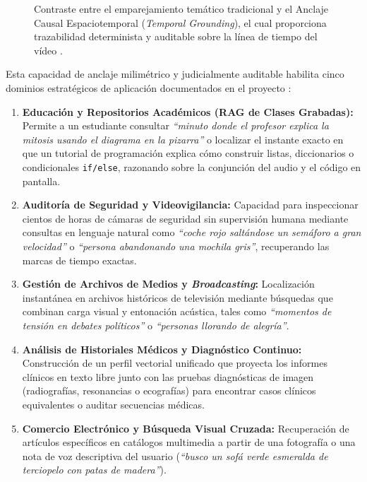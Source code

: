 \begin{figure}[htbp]
\caption{Contraste entre el emparejamiento temático tradicional y el Anclaje Causal Espaciotemporal (\textit{Temporal Grounding}), el cual proporciona trazabilidad determinista y auditable sobre la línea de tiempo del vídeo \cite{mixpeek_chunking, gemini_emb2_docs}.} %
\label{fig:emparejamiento_vs_grounding_temporal}
\end{figure}

Esta capacidad de anclaje milimétrico y judicialmente auditable habilita cinco dominios estratégicos de aplicación documentados en el proyecto \cite{gemini_emb2_docs}: %
\begin{enumerate}
    \item \textbf{Educación y Repositorios Académicos (RAG de Clases Grabadas):} Permite a un estudiante consultar \textit{``minuto donde el profesor explica la mitosis usando el diagrama en la pizarra''} o localizar el instante exacto en que un tutorial de programación explica cómo construir listas, diccionarios o condicionales \texttt{if/else}, razonando sobre la conjunción del audio y el código en pantalla. %
    \item \textbf{Auditoría de Seguridad y Videovigilancia:} Capacidad para inspeccionar cientos de horas de cámaras de seguridad sin supervisión humana mediante consultas en lenguaje natural como \textit{``coche rojo saltándose un semáforo a gran velocidad''} o \textit{``persona abandonando una mochila gris''}, recuperando las marcas de tiempo exactas. %
    \item \textbf{Gestión de Archivos de Medios y \textit{Broadcasting}:} Localización instantánea en archivos históricos de televisión mediante búsquedas que combinan carga visual y entonación acústica, tales como \textit{``momentos de tensión en debates políticos''} o \textit{``personas llorando de alegría''}. %
    \item \textbf{Análisis de Historiales Médicos y Diagnóstico Continuo:} Construcción de un perfil vectorial unificado que proyecta los informes clínicos en texto libre junto con las pruebas diagnósticas de imagen (radiografías, resonancias o ecografías) para encontrar casos clínicos equivalentes o auditar secuencias médicas. %
    \item \textbf{Comercio Electrónico y Búsqueda Visual Cruzada:} Recuperación de artículos específicos en catálogos multimedia a partir de una fotografía o una nota de voz descriptiva del usuario (\textit{``busco un sofá verde esmeralda de terciopelo con patas de madera''}). %
\end{enumerate}

